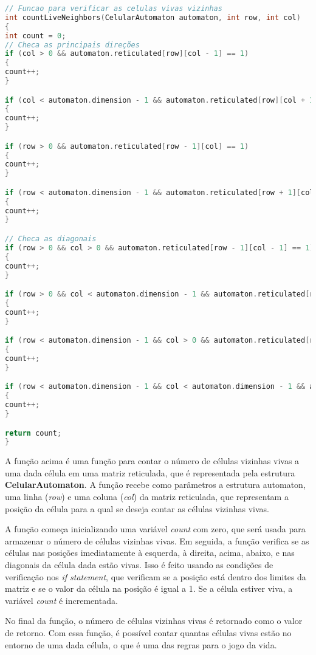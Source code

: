 \documentclass{article}
\begin{document}
 \begin{lstlisting}[caption={Função countLiveNeighbors.},label={lst:cod2},language=C]
// Funcao para verificar as celulas vivas vizinhas
int countLiveNeighbors(CelularAutomaton automaton, int row, int col)
{
int count = 0;
// Checa as principais direções
if (col > 0 && automaton.reticulated[row][col - 1] == 1)
{
count++;
}

if (col < automaton.dimension - 1 && automaton.reticulated[row][col + 1] == 1)
{
count++;
}

if (row > 0 && automaton.reticulated[row - 1][col] == 1)
{
count++;
}

if (row < automaton.dimension - 1 && automaton.reticulated[row + 1][col] == 1)
{
count++;
}

// Checa as diagonais
if (row > 0 && col > 0 && automaton.reticulated[row - 1][col - 1] == 1)
{
count++;
}

if (row > 0 && col < automaton.dimension - 1 && automaton.reticulated[row - 1][col + 1] == 1)
{
count++;
}

if (row < automaton.dimension - 1 && col > 0 && automaton.reticulated[row + 1][col - 1] == 1)
{
count++;
}

if (row < automaton.dimension - 1 && col < automaton.dimension - 1 && automaton.reticulated[row + 1][col + 1] == 1)
{
count++;
}

return count;
}
 \end{lstlisting}
 
 A função acima é uma função para contar o número de células vizinhas vivas a uma dada célula em uma matriz reticulada, que é representada pela estrutura \textbf{CelularAutomaton}. A função recebe como parâmetros a estrutura automaton, uma linha (\textit{row}) e uma coluna (\textit{col}) da matriz reticulada, que representam a posição da célula para a qual se deseja contar as células vizinhas vivas.

A função começa inicializando uma variável \textit{count} com zero, que será usada para armazenar o número de células vizinhas vivas. Em seguida, a função verifica se as células nas posições imediatamente à esquerda, à direita, acima, abaixo, e nas diagonais da célula dada estão vivas. Isso é feito usando as condições de verificação nos \textit{if statement}, que verificam se a posição está dentro dos limites da matriz e se o valor da célula na posição é igual a 1. Se a célula estiver viva, a variável \textit{count} é incrementada.

No final da função, o número de células vizinhas vivas é retornado como o valor de retorno. Com essa função, é possível contar quantas células vivas estão no entorno de uma dada célula, o que é uma das regras para o jogo da vida.
\end{document}
